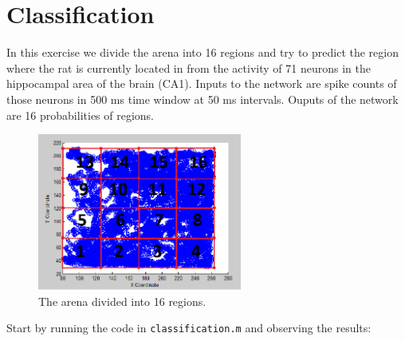 \documentclass[a4paper,11pt]{article}
\begin{document}
%
%
\section{Classification}

In this exercise we divide the arena into 16 regions and try to predict the region where the rat is currently located in from the activity of 71 neurons in the hippocampal area of the brain (CA1). Inputs to the network are spike counts of those neurons in 500 ms time window at 50 ms intervals. Ouputs of the network are 16 probabilities of regions.

\begin{figure}[h]
	\centering
	\includegraphics[width=0.6\textwidth]{arena16.png}
	\caption{The arena divided into 16 regions.}
\end{figure}

Start by running the code in \texttt{classification.m} and observing the results:
\end{document}
